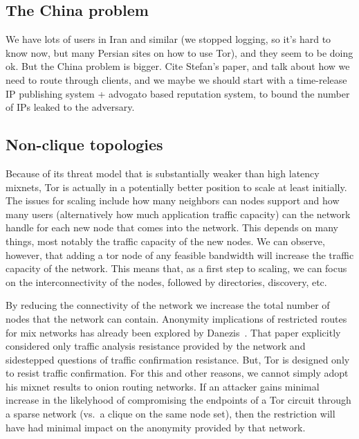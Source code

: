 \documentclass{llncs}
\begin{document}
\subsection{The China problem}

We have lots of users in Iran and similar (we stopped
logging, so it's hard to know now, but many Persian sites on how to use
Tor), and they seem to be doing ok. But the China problem is bigger. Cite
Stefan's paper, and talk about how we need to route through clients,
and we maybe we should start with a time-release IP publishing system +
advogato based reputation system, to bound the number of IPs leaked to the
adversary.

\cite{infranet}
\cite{koepsell-wpes2004}
\cite{advogato}
\cite{berkman}

\subsection{Non-clique topologies}

Because of its threat model that is substantially weaker than high
latency mixnets, Tor is actually in a potentially better position to
scale at least initially. The issues for scaling include how many
neighbors can nodes support and how many users (alternatively how much
application traffic capacity) can the network handle for each new node
that comes into the network. This depends on many things, most notably
the traffic capacity of the new nodes.  We can observe, however, that
adding a tor node of any feasible bandwidth will increase the traffic
capacity of the network. This means that, as a first step to scaling,
we can focus on the interconnectivity of the nodes, followed by
directories, discovery, etc.

By reducing the connectivity of the network we increase the total
number of nodes that the network can contain. Anonymity implications
of restricted routes for mix networks has already been explored by
Danezis~\cite{danezis-pets03}.  That paper explicitly considered only
traffic analysis resistance provided by the network and sidestepped
questions of traffic confirmation resistance. But, Tor is designed
only to resist traffic confirmation. For this and other reasons, we
cannot simply adopt his mixnet results to onion routing networks.  If
an attacker gains minimal increase in the likelyhood of compromising
the endpoints of a Tor circuit through a sparse network (vs.\ a clique
on the same node set), then the restriction will have had minimal
impact on the anonymity provided by that network.
\end{document}
